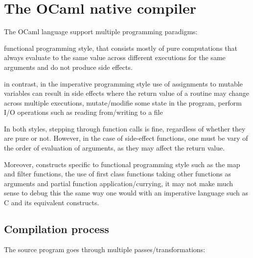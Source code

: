 \chapter{The OCaml native compiler\label{cha:chapter3}}

The OCaml language support multiple programming paradigms:

functional programming style, that consists mostly of pure computations that always
evaluate to the same value across different executions for the same arguments
and do not produce side effects.

in contrast, in the imperative programming style
use of assignments to mutable variables can result in side effects
where the return value of a routine may change across multiple executions,
mutate/modifie some state in the program, perform I/O operations
such as reading from/writing to a file

In both styles, stepping through function calls is fine, regardless of whether
they are pure or not.
However, in the case of side-effect functions, one must be vary of the order of
evaluation of arguments, as they may affect the return value.

Moreover, constructs specific to functional programming style such as the map
and filter functions, the use of first class functions taking other functions as
arguments and partial function application/currying,
it may not make much sense to debug this the same way one would with
an imperative language such as C and its equivalent constructs.

\section{Compilation process}

The source program goes through multiple passes/transformations:

